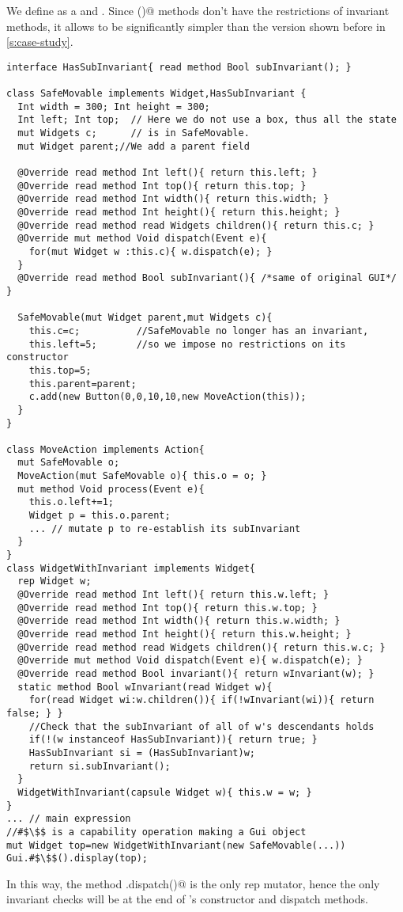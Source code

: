 We define \Q@SafeMovable@ as a \Q@Widget@ and \Q@HasSubInvariant@. Since \Q@subInvariant()@ methods don't have the restrictions of invariant methods, it allows \Q@SafeMovable@ to be significantly simpler than the version shown before in \autoref{s:case-study}.
\begin{lstlisting}
interface HasSubInvariant{ read method Bool subInvariant(); }

class SafeMovable implements Widget,HasSubInvariant {
  Int width = 300; Int height = 300;
  Int left; Int top;  // Here we do not use a box, thus all the state
  mut Widgets c;      // is in SafeMovable.
  mut Widget parent;//We add a parent field

  @Override read method Int left(){ return this.left; }
  @Override read method Int top(){ return this.top; }
  @Override read method Int width(){ return this.width; }
  @Override read method Int height(){ return this.height; }
  @Override read method read Widgets children(){ return this.c; }
  @Override mut method Void dispatch(Event e){
    for(mut Widget w :this.c){ w.dispatch(e); }
  }
  @Override read method Bool subInvariant(){ /*same of original GUI*/ }

  SafeMovable(mut Widget parent,mut Widgets c){
    this.c=c;          //SafeMovable no longer has an invariant,
    this.left=5;       //so we impose no restrictions on its constructor
    this.top=5;
    this.parent=parent;
    c.add(new Button(0,0,10,10,new MoveAction(this));
  }
}

class MoveAction implements Action{
  mut SafeMovable o;
  MoveAction(mut SafeMovable o){ this.o = o; }
  mut method Void process(Event e){
    this.o.left+=1;
    Widget p = this.o.parent;
    ... // mutate p to re-establish its subInvariant
  }
}
class WidgetWithInvariant implements Widget{
  rep Widget w;
  @Override read method Int left(){ return this.w.left; }
  @Override read method Int top(){ return this.w.top; }
  @Override read method Int width(){ return this.w.width; }
  @Override read method Int height(){ return this.w.height; }
  @Override read method read Widgets children(){ return this.w.c; }
  @Override mut method Void dispatch(Event e){ w.dispatch(e); }
  @Override read method Bool invariant(){ return wInvariant(w); }
  static method Bool wInvariant(read Widget w){
    for(read Widget wi:w.children()){ if(!wInvariant(wi)){ return false; } }
    //Check that the subInvariant of all of w's descendants holds
    if(!(w instanceof HasSubInvariant)){ return true; }
    HasSubInvariant si = (HasSubInvariant)w;
    return si.subInvariant();
  }
  WidgetWithInvariant(capsule Widget w){ this.w = w; }
}
... // main expression
//#$\$$ is a capability operation making a Gui object
mut Widget top=new WidgetWithInvariant(new SafeMovable(...))
Gui.#$\$$().display(top);
\end{lstlisting}
In this way, the method \Q@WidgetWithInvariant.dispatch()@ is the only rep mutator, hence the only invariant checks will be at the end of \Q@WidgetWithInvariant@'s constructor and dispatch methods.

